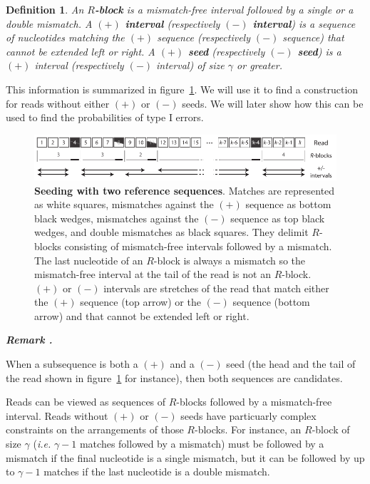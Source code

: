 \documentclass{article}
\newtheorem{definition}{Definition}
\newcounter{remarkcounter}
\newenvironment{remark}
{\small\it\vspace{0.5\baselineskip}
  \refstepcounter{remarkcounter}%
  \noindent\textbf{Remark \arabic{remarkcounter}.}%
}{\vspace{0.5\baselineskip}}
\begin{document}
\begin{definition}
An \textbf{$R$-block} is a mismatch-free interval followed by a single or
a double mismatch. A \textbf{$(+)$ interval} (respectively \textbf{$(-)$
interval}) is a sequence of nucleotides matching the $(+)$ sequence
(respectively $(-)$ sequence) that cannot be extended left or right. A
\textbf{$(+)$ seed} (respectively \textbf{$(-)$ seed}) is a $(+)$ interval
(respectively $(-)$ interval) of size $\gamma$ or greater.
\end{definition}

This information is summarized in figure~\ref{fig:sketchdual}. We will use
it to find a construction for reads without either $(+)$ or $(-)$ seeds.
We will later show how this can be used to find the probabilities of type
I errors.

\begin{figure}[h]
\centering
\includegraphics[scale=0.88]{sketch_dual_mutations.pdf}
\caption{\textbf{Seeding with two reference sequences}.
Matches are represented as white squares, mismatches against the $(+)$
sequence as bottom black wedges, mismatches against the $(-)$ sequence as
top black wedges, and double mismatches as black squares. They delimit
$R$-blocks consisting of mismatch-free intervals followed by a mismatch.
The last nucleotide of an $R$-block is always a mismatch so the
mismatch-free interval at the tail of the read is not an $R$-block. $(+)$
or $(-)$ intervals are stretches of the read that match either the $(+)$
sequence (top arrow) or the $(-)$ sequence (bottom arrow) and that cannot
be extended left or right.}
\label{fig:sketchdual}
\end{figure}

\begin{remark}
When a subsequence is both a $(+)$ and a $(-)$ seed (the head and the tail
of the read shown in figure~\ref{fig:sketchdual} for instance), then both
sequences are candidates.
\end{remark}

Reads can be viewed as sequences of $R$-blocks followed by a mismatch-free
interval. Reads without $(+)$ or $(-)$ seeds have particuarly complex
constraints on the arrangements of those $R$-blocks. For instance, an
$R$-block of size $\gamma$ (\textit{i.e.} $\gamma-1$ matches followed by a
mismatch) must be followed by a mismatch if the final nucleotide is a
single mismatch, but it can be followed by up to $\gamma-1$ matches if the
last nucleotide is a double mismatch.
\end{document}
